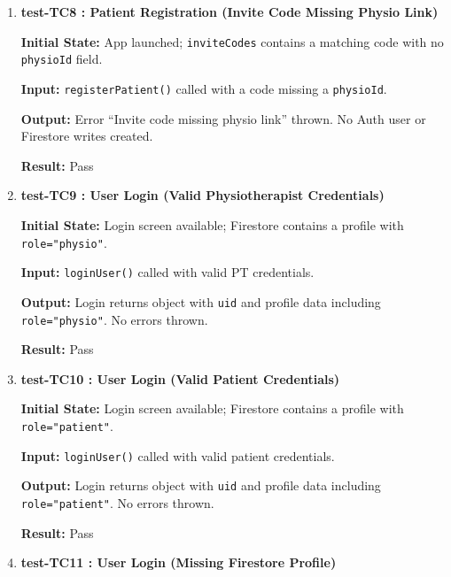 \documentclass[12pt, titlepage]{article}
\begin{document}
\begin{enumerate}
	\textbf{Output:} Error ``Invite code already used'' thrown. No Auth user or Firestore writes created.
	
	\textbf{Result:} Pass
	
	\vspace{0.5em}
	
	\item \textbf{test-TC8 : Patient Registration (Invite Code Missing Physio Link)}
	
	\textbf{Initial State:} App launched; \texttt{inviteCodes} contains a matching code with no \texttt{physioId} field.
	
	\textbf{Input:} \texttt{registerPatient()} called with a code missing a \texttt{physioId}.
	
	\textbf{Output:} Error ``Invite code missing physio link'' thrown. No Auth user or Firestore writes created.
	
	\textbf{Result:} Pass
	
	\vspace{0.5em}
	
	\item \textbf{test-TC9 : User Login (Valid Physiotherapist Credentials)}
	
	\textbf{Initial State:} Login screen available; Firestore contains a profile with \texttt{role="physio"}.
	
	\textbf{Input:} \texttt{loginUser()} called with valid PT credentials.
	
	\textbf{Output:} Login returns object with \texttt{uid} and profile data including \texttt{role="physio"}. No errors thrown.
	
	\textbf{Result:} Pass
	
	\vspace{0.5em}
	
	\item \textbf{test-TC10 : User Login (Valid Patient Credentials)}
	
	\textbf{Initial State:} Login screen available; Firestore contains a profile with \texttt{role="patient"}.
	
	\textbf{Input:} \texttt{loginUser()} called with valid patient credentials.
	
	\textbf{Output:} Login returns object with \texttt{uid} and profile data including \texttt{role="patient"}. No errors thrown.
	
	\textbf{Result:} Pass
	
	\vspace{0.5em}
	
	\item \textbf{test-TC11 : User Login (Missing Firestore Profile)}
	

\end{enumerate}
\end{document}
